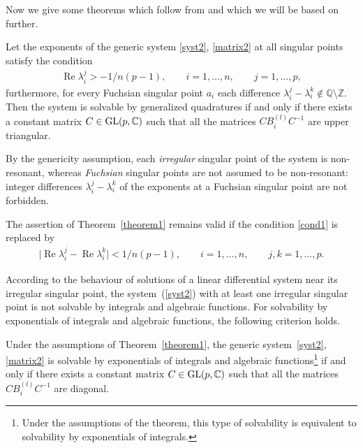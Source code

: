 Now we give some theorems which follow from \cite{Go, GV} and which we will be based on further.

\begin{Theorem}\label{theorem1}Let the exponents of the generic system \eqref{syst2}, \eqref{matrix2} at all singular points satisfy the condition
\begin{gather}\label{cond1}
\operatorname{Re}\lambda_i^j>-1/n(p-1), \qquad i=1,\ldots,n, \qquad j=1,\ldots,p,
\end{gather}
furthermore, for every Fuchsian singular point $a_i$ each difference $\lambda_i^j-\lambda_i^k\not\in{\mathbb Q} \setminus{\mathbb Z}$. Then the system is solvable by generalized quadratures if and only if there exists a constant matrix $C\in{\rm GL}(p,\mathbb C)$ such that all the matrices $CB_i^{(l)}C^{-1}$ are upper triangular.
\end{Theorem}

\begin{Remark} By the genericity assumption, each {\it irregular} singular point of the system is non-resonant, whereas
{\it Fuchsian} singular points are not assumed to be non-resonant: integer differences $\lambda_i^j-\lambda_i^k$ of the
exponents at a Fuchsian singular point are not forbidden.
\end{Remark}

\begin{Theorem}\label{theorem1'}
The assertion of Theorem~{\rm \ref{theorem1}} remains valid if the condition \eqref{cond1} is replaced by
\begin{gather*}%
\bigl|\operatorname{Re}\lambda_i^j-\operatorname{Re}\lambda_i^k\bigr|<1/n(p-1), \qquad i=1,\ldots,n, \qquad j,k=1,\ldots,p.
\end{gather*}
\end{Theorem}

According to the behaviour of solutions of a linear differential system near its irregular singular point, the system~(\ref{syst2}) with at least one irregular singular point is not solvable by integrals and algebraic functions.
For solvability by exponentials of integrals and algebraic functions, the following criterion holds.

\begin{Theorem}\label{theorem2}
Under the assumptions of Theorem~{\rm \ref{theorem1}}, the generic system~\eqref{syst2}, \eqref{matrix2} is solvable by exponentials of integrals and algebraic functions\footnote{Under the assumptions of the theorem, this type of solvability is equivalent to solvability by exponentials of integrals.} if and only if there exists a constant matrix $C\in{\rm GL}(p,\mathbb C)$ such that all the matrices $CB_i^{(l)}C^{-1}$ are diagonal.
\end{Theorem}


